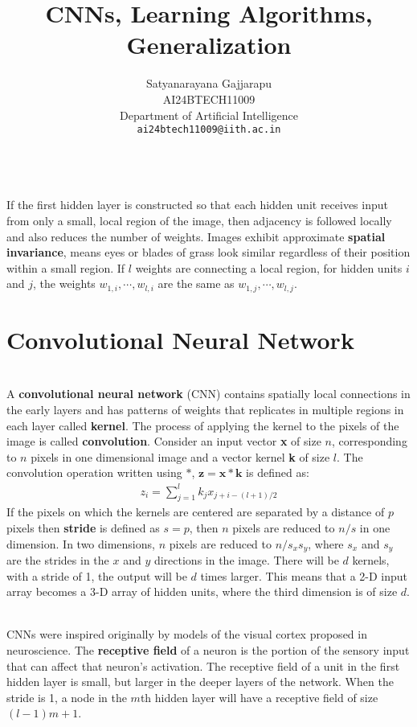 \documentclass{article}
\title{CNNs, Learning Algorithms, Generalization}
\author{%
Satyanarayana Gajjarapu \\
AI24BTECH11009 \\
Department of Artificial Intelligence \\
\texttt{ai24btech11009@iith.ac.in} \\
}
\begin{document}
\maketitle
\begin{paragraph}
\\
If the first hidden layer is constructed so that each hidden unit receives input from only a small, local region of the image, then adjacency is followed locally and also reduces the number of weights. Images exhibit approximate \textbf{spatial invariance}, means eyes or blades of grass look similar regardless of their position within a small region. If $l$ weights are connecting a local region, for hidden units $i$ and $j$, the weights $w_{1,i},\cdots,w_{l,i}$ are the same as $w_{1, j},\cdots,w_{l, j}$.
\end{paragraph}
\section{Convolutional Neural Network}
\begin{paragraph}
\\
A \textbf{convolutional neural network} (CNN) contains spatially local connections in the early layers and has patterns of weights that replicates in multiple regions in each layer called \textbf{kernel}. The process of applying the kernel to the pixels of the image is called \textbf{convolution}. Consider an input vector \textbf{x} of size $n$, corresponding to $n$ pixels in one dimensional image and a vector kernel \textbf{k} of size $l$. The convolution operation written using $\ast$, $\textbf{z} = \textbf{x}\ast\textbf{k}$ is defined as:
\begin{align*}
    z_i = \sum\limits_{j=1}^{l}k_jx_{j+i-(l+1)/2}
\end{align*}
If the pixels on which the kernels are centered are separated by a distance of $p$ pixels then \textbf{stride} is defined as $s=p$, then $n$ pixels are reduced to $n/s$ in one dimension. In two dimensions, $n$ pixels are reduced to $n/s_xs_y$, where $s_x$ and $s_y$ are the strides in the $x$ and $y$ directions in the image. There will be $d$ kernels, with a stride of 1, the output will be $d$ times larger. This means that a 2-D input array becomes a 3-D array of hidden units, where the third dimension is of size $d$.
\end{paragraph}
\begin{paragraph}
\\
CNNs were inspired originally by models of the visual cortex proposed in neuroscience. The \textbf{receptive field} of a neuron is the portion of the sensory input that can affect that neuron’s activation. The receptive field of a unit in the first hidden layer is small, but larger in the deeper layers of the network. When the stride is 1, a node in the $m$th hidden layer will have a receptive field of size $(l-1)m + 1$.
\end{paragraph}
\end{document}
